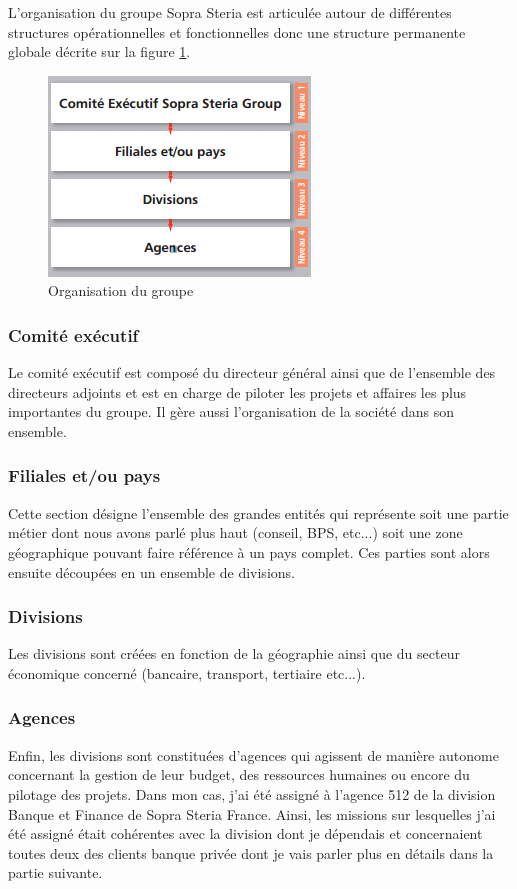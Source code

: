 	L'organisation du groupe Sopra Steria est articulée autour de différentes structures opérationnelles et fonctionnelles donc une structure permanente globale décrite sur la figure \ref{sopraSteriaOrganisation}.

\begin{figure}[h]
	\includegraphics[scale=0.8]{images/entreprise/sopraSteriaOrganisation.png}
	\centering
	\caption{Organisation du groupe}
	\label{sopraSteriaOrganisation}
\end{figure}
		
\subsubsection{Comité exécutif}

	Le comité exécutif est composé du directeur général ainsi que de l'ensemble des directeurs adjoints et est en charge de piloter les projets et affaires les plus importantes du groupe. Il gère aussi l'organisation de la société dans son ensemble.

\subsubsection{Filiales et/ou pays}

	Cette section désigne l'ensemble des grandes entités qui représente soit une partie métier dont nous avons parlé plus haut (conseil, BPS, etc...) soit une zone géographique pouvant faire référence à un pays complet. Ces parties sont alors ensuite découpées en un ensemble de divisions.

\subsubsection{Divisions}

	Les divisions sont créées en fonction de la géographie ainsi que du secteur économique concerné (bancaire, transport, tertiaire etc...).

\subsubsection{Agences}

	Enfin, les divisions sont constituées d'agences qui agissent de manière autonome concernant la gestion de leur budget, des ressources humaines ou encore du pilotage des projets. Dans mon cas, j'ai été assigné à l'agence 512 de la division Banque et Finance de Sopra Steria France. Ainsi, les missions sur lesquelles j'ai été assigné était cohérentes avec la division dont je dépendais et concernaient toutes deux des clients banque privée dont je vais parler plus en détails dans la partie suivante.